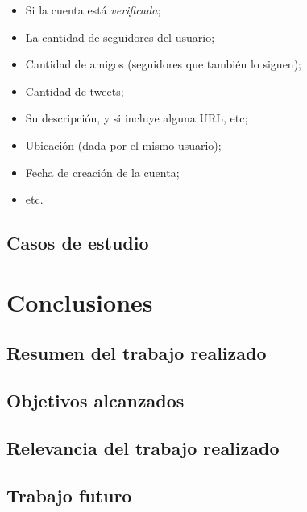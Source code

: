 \documentclass[upright, contnum]{umemoria}
\begin{document}
\begin{itemize}
\item Si la cuenta está \emph{verificada};
\item La cantidad de seguidores del usuario;
\item Cantidad de amigos (seguidores que también lo siguen);
\item Cantidad de tweets;
\item Su descripción, y si incluye alguna URL, etc;
\item Ubicación (dada por el mismo usuario);
\item Fecha de creación de la cuenta;
\item etc.
\end{itemize}

\section{Casos de estudio}
\label{sec-4.6}


\chapter{Conclusiones}
\label{sec-5}

\section{Resumen del trabajo realizado}
\label{sec-5.1}

\section{Objetivos alcanzados}
\label{sec-5.2}

\section{Relevancia del trabajo realizado}
\label{sec-5.3}

\section{Trabajo futuro}
\label{sec-5.4}


   




\nocite{*}


\end{document}
